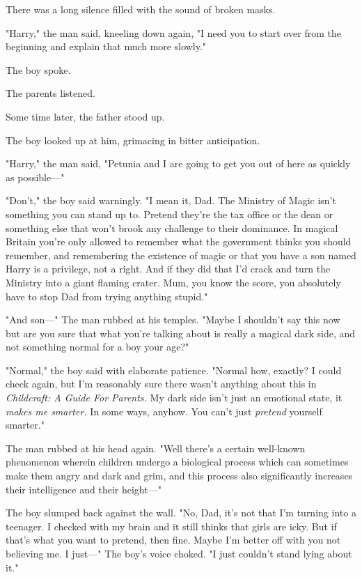 There was a long silence filled with the sound of broken masks.

"Harry," the man said, kneeling down again, "I need you to start over from the
beginning and explain that much more slowly."

The boy spoke.

The parents listened.

Some time later, the father stood up.

The boy looked up at him, grimacing in bitter anticipation.

"Harry," the man said, "Petunia and I are going to get you out of here as
quickly as possible\mbox{---}"

"Don't," the boy said warningly. "I mean it, Dad. The Ministry of Magic isn't
something you can stand up to. Pretend they're the tax office or the dean or
something else that won't brook any challenge to their dominance. In magical
Britain you're only allowed to remember what the government thinks you should
remember, and remembering the existence of magic or that you have a son named
Harry is a privilege, not a right. And if they did that I'd crack and turn the
Ministry into a giant flaming crater. Mum, you know the score, you absolutely
have to stop Dad from trying anything stupid."

"And son\mbox{---}" The man rubbed at his temples. "Maybe I shouldn't say this
now{\el} but are you sure that what you're talking about is really a magical
dark side, and not something normal for a boy your age?"

"Normal," the boy said with elaborate patience. "Normal how, exactly? I could
check again, but I'm reasonably sure there wasn't anything about this in
\emph{Childcraft: A Guide For Parents.} My dark side isn't just an emotional
state, it \emph{makes me smarter.} In some ways, anyhow. You can't just
\emph{pretend} yourself smarter."

The man rubbed at his head again. "Well{\el} there's a certain well-known
phenomenon wherein children undergo a biological process which can sometimes
make them angry and dark and grim, and this process also significantly
increases their intelligence and their height\mbox{---}"

The boy slumped back against the wall. "No, Dad, it's not that I'm turning into
a teenager. I checked with my brain and it still thinks that girls are icky.
But if that's what you want to pretend, then fine. Maybe I'm better off with
you not believing me. I just\mbox{---}" The boy's voice choked. "I just couldn't stand
lying about it."

